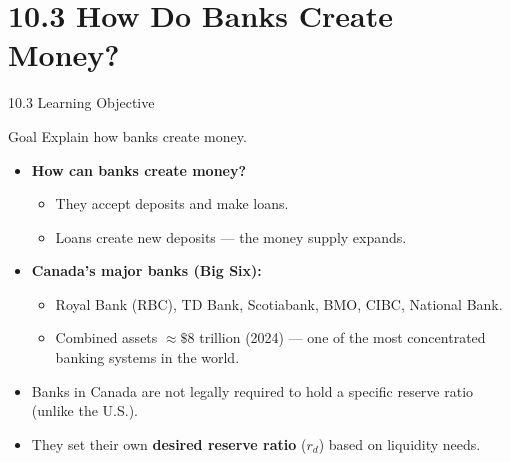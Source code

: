 \documentclass[aspectratio=169]{beamer}
\begin{document}
\section{10.3 How Do Banks Create Money?}

\begin{frame}{10.3 Learning Objective}
\transfade
\begin{block}{Goal}
Explain how banks create money.
\end{block}
\begin{itemize}[<+->]
  \item \textbf{How can banks create money?}
  \begin{itemize}[<+->]
    \item They accept deposits and make loans.
    \item Loans create new deposits --- the money supply \alert{expands}.
  \end{itemize}
  \item \textbf{Canada's major banks (Big Six):}
  \begin{itemize}[<+->]
    \item Royal Bank (RBC), TD Bank, Scotiabank, BMO, CIBC, National Bank.
    \item Combined assets $\approx \$8$ trillion (2024) --- one of the most concentrated banking systems in the world.
  \end{itemize}
  \item Banks in Canada are not legally required to hold a specific reserve ratio (unlike the U.S.).
  \item They set their own \textbf{desired reserve ratio} ($r_d$) based on liquidity needs.
\end{itemize}
\end{frame}
\end{document}
